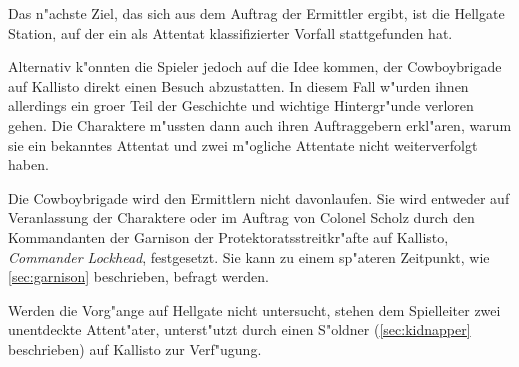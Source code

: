 
Das n"achste Ziel, das sich aus dem Auftrag der Ermittler ergibt, ist die Hellgate Station, auf der ein als Attentat klassifizierter Vorfall stattgefunden hat. 

Alternativ k"onnten die Spieler jedoch auf die Idee kommen, der Cowboybrigade auf Kallisto direkt einen Besuch abzustatten. In diesem Fall w"urden ihnen allerdings ein gro\3er Teil der Geschichte und wichtige Hintergr"unde verloren gehen. Die Charaktere m"ussten dann auch ihren Auftraggebern erkl"aren, warum sie ein bekanntes Attentat und zwei m"ogliche Attentate nicht weiterverfolgt haben.

Die Cowboybrigade wird den Ermittlern nicht davonlaufen. Sie wird entweder auf Veranlassung der Charaktere oder im Auftrag von Colonel Scholz durch den Kommandanten der Garnison der Protektoratsstreitkr"afte auf Kallisto, \emph{Commander Lockhead}, festgesetzt. Sie kann zu einem sp"ateren Zeitpunkt, wie  \cref{sec:garnison} beschrieben, befragt werden.

Werden die Vorg"ange auf Hellgate nicht untersucht, stehen dem Spielleiter zwei unentdeckte Attent"ater, unterst"utzt durch einen S"oldner (\cref{sec:kidnapper} beschrieben) auf Kallisto zur Verf"ugung.
\vfill
